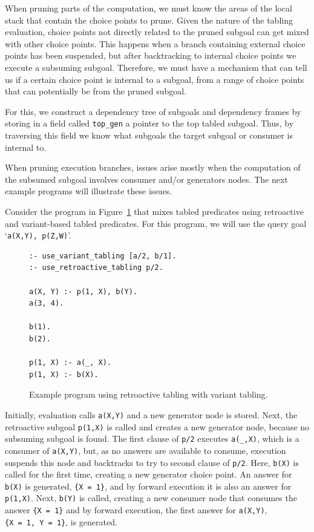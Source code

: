 When pruning parts of the computation, we must know the areas of the local stack
that contain the choice points to prune. Given the nature of the tabling evaluation, choice points not
directly related to the pruned subgoal can get mixed with other choice points. This happens when a branch
containing external choice points has been suspended, but after backtracking to internal choice points we
execute a subsuming subgoal. Therefore, we must have a mechanism that can tell us if a certain choice
point is internal to a subgoal, from a range of choice points that can potentially be from
the pruned subgoal.

For this, we construct a dependency tree of subgoals and dependency frames by storing in a field
called \texttt{top\_gen} a pointer to the top tabled subgoal. Thus, by traversing this field we know
what subgoals the target subgoal or consumer is internal to.

When pruning execution branches, issues arise mostly when the computation of the subsumed subgoal involves
consumer and/or generators nodes. The next example programs will illustrate these issues.

Consider the program in Figure~\ref{fig:retro_program2} that mixes tabled predicates using retroactive
and variant-based tabled predicates.
For this program, we will use the query goal `\texttt{a(X,Y),~p(Z,W)}'.

\begin{figure}[ht]
\begin{Verbatim}
:- use_variant_tabling [a/2, b/1].
:- use_retroactive_tabling p/2.

a(X, Y) :- p(1, X), b(Y).
a(3, 4).

b(1).
b(2).

p(1, X) :- a(_, X).
p(1, X) :- b(X).
\end{Verbatim}
\caption{Example program using retroactive tabling with variant tabling.}
\label{fig:retro_program2}
\end{figure}

Initially, evaluation calls \texttt{a(X,Y)} and a new generator node is stored. Next, the retroactive subgoal
\texttt{p(1,X)} is called and creates a new generator node, because no subsuming subgoal is found.
The first clause of \texttt{p/2} executes \texttt{a(\_,X)}, which is a consumer of \texttt{a(X,Y)}, but, as
no answers are available to consume, execution suspends this node and backtracks to try to second clause
of \texttt{p/2}. Here, \texttt{b(X)} is called for the first time, creating a new generator choice point.
An answer for \texttt{b(X)} is generated, \texttt{\{X~=~1\}}, and by forward execution it is also an answer
for \texttt{p(1,X)}. Next, \texttt{b(Y)} is called, creating a new consumer node that consumes the answer
\texttt{\{X~=~1\}} and by forward execution, the first answer for \texttt{a(X,Y)}, \texttt{\{X~=~1,~Y~=~1\}},
is generated.

